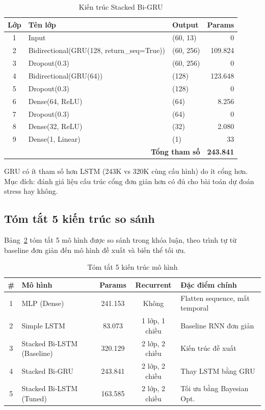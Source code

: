 \begin{table}[H]
\centering
\caption{Kiến trúc Stacked Bi-GRU}
\label{tab:bigru_architecture}
\small
\begin{tabular}{|c|l|l|r|}
\hline
\textbf{Lớp} & \textbf{Tên lớp} & \textbf{Output} & \textbf{Params} \\
\hline
1 & Input                                   & (60, 13)   & 0 \\
2 & Bidirectional(GRU(128, return\_seq=True)) & (60, 256)  & 109.824 \\
3 & Dropout(0.3)                            & (60, 256)  & 0 \\
4 & Bidirectional(GRU(64))                  & (128)      & 123.648 \\
5 & Dropout(0.3)                            & (128)      & 0 \\
6 & Dense(64, ReLU)                         & (64)       & 8.256 \\
7 & Dropout(0.3)                            & (64)       & 0 \\
8 & Dense(32, ReLU)                         & (32)       & 2.080 \\
9 & Dense(1, Linear)                        & (1)        & 33 \\
\hline
\multicolumn{3}{|r|}{\textbf{Tổng tham số}} & \textbf{243.841} \\
\hline
\end{tabular}
\end{table}

GRU có ít tham số hơn LSTM (243K vs 320K cùng cấu hình) do ít cổng hơn. Mục đích: đánh giá liệu cấu trúc cổng đơn giản hơn có đủ cho bài toán dự đoán stress hay không.

\subsection{Tóm tắt 5 kiến trúc so sánh}
\label{subsec:model_summary}

Bảng~\ref{tab:five_models} tóm tắt 5 mô hình được so sánh trong khóa luận, theo trình tự từ baseline đơn giản đến mô hình đề xuất và biến thể tối ưu.

\begin{table}[H]
\centering
\caption{Tóm tắt 5 kiến trúc mô hình}
\label{tab:five_models}
\small
\begin{tabular}{|c|l|c|c|l|}
\hline
\textbf{\#} & \textbf{Mô hình} & \textbf{Params} & \textbf{Recurrent} & \textbf{Đặc điểm chính} \\
\hline
1 & MLP (Dense)                 & 241.153 & Không     & Flatten sequence, mất temporal \\
2 & Simple LSTM                 & 83.073  & 1 lớp, 1 chiều & Baseline RNN đơn giản \\
3 & Stacked Bi-LSTM (Baseline)  & 320.129 & 2 lớp, 2 chiều & Kiến trúc đề xuất \\
4 & Stacked Bi-GRU              & 243.841 & 2 lớp, 2 chiều & Thay LSTM bằng GRU \\
5 & Stacked Bi-LSTM (Tuned)     & 163.585 & 2 lớp, 2 chiều & Tối ưu bằng Bayesian Opt. \\
\hline
\end{tabular}
\end{table}

